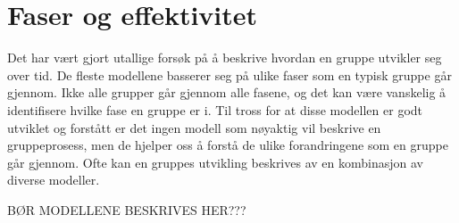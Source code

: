 \section{Faser og effektivitet}
Det har vært gjort utallige forsøk på å beskrive hvordan en gruppe utvikler seg over tid. 
De fleste modellene basserer seg på ulike faser som en typisk gruppe går gjennom. 
Ikke alle grupper går gjennom alle fasene, og det kan være vanskelig å identifisere hvilke fase en gruppe er i.
Til tross for at disse modellen er godt utviklet og forstått er det ingen modell som nøyaktig vil beskrive en gruppeprosess, men de hjelper oss å forstå de ulike forandringene som en gruppe går gjennom. 
Ofte kan en gruppes utvikling beskrives av en kombinasjon av diverse modeller. 
\vspace{\secspace}

BØR MODELLENE BESKRIVES HER???


